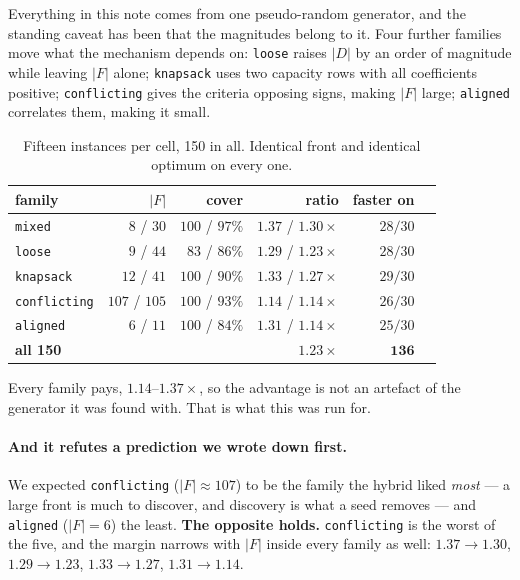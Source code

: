 \documentclass[11pt,a4paper]{article}
\newcommand{\Dset}{D}
\begin{document}
Everything in this note comes from one pseudo-random generator, and the
standing caveat has been that the magnitudes belong to it.  Four further
families move what the mechanism depends on: \texttt{loose} raises $|\Dset|$
by an order of magnitude while leaving $|F|$ alone; \texttt{knapsack} uses two
capacity rows with all coefficients positive; \texttt{conflicting} gives the
criteria opposing signs, making $|F|$ large; \texttt{aligned} correlates them,
making it small.

\begin{table}[h]
\centering
\caption{Fifteen instances per cell, 150 in all.  Identical front and identical
optimum on every one.}
\begin{tabular}{lrrrrr}
\toprule
family & $|F|$ & cover & ratio & faster on \\
\midrule
\texttt{mixed}       & $8$ / $30$   & $100$ / $97\%$ & $\mathbf{1.37}$ / $1.30\times$ & $28/30$ \\
\texttt{loose}       & $9$ / $44$   & $83$ / $86\%$  & $1.29$ / $1.23\times$ & $28/30$ \\
\texttt{knapsack}    & $12$ / $41$  & $100$ / $90\%$ & $1.33$ / $1.27\times$ & $29/30$ \\
\texttt{conflicting} & $107$ / $105$ & $100$ / $93\%$ & $1.14$ / $1.14\times$ & $26/30$ \\
\texttt{aligned}     & $6$ / $11$   & $100$ / $84\%$ & $1.31$ / $1.14\times$ & $25/30$ \\
\midrule
\textbf{all 150} & & & $\mathbf{1.23\times}$ & $\mathbf{136}$ \\
\bottomrule
\end{tabular}
\end{table}

\noindent
Every family pays, $1.14$--$1.37\times$, so the advantage is not an artefact of
the generator it was found with.  That is what this was run for.

\paragraph{And it refutes a prediction we wrote down first.}  We expected
\texttt{conflicting} ($|F| \approx 107$) to be the family the hybrid liked
\emph{most} --- a large front is much to discover, and discovery is what a seed
removes --- and \texttt{aligned} ($|F| = 6$) the least.  \textbf{The opposite
holds.}  \texttt{conflicting} is the worst of the five, and the margin narrows
with $|F|$ inside every family as well: $1.37 \to 1.30$, $1.29 \to 1.23$,
$1.33 \to 1.27$, $1.31 \to 1.14$.
\end{document}
